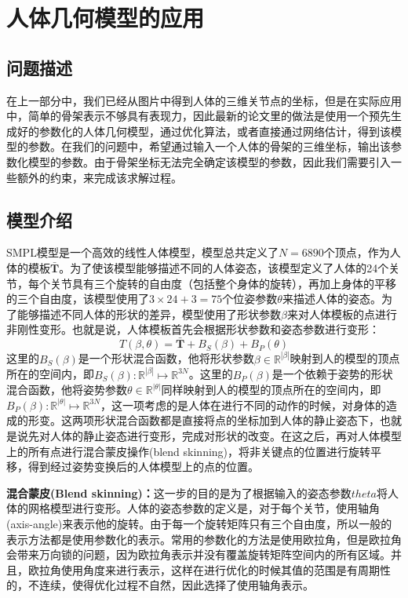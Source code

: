 \section{人体几何模型的应用}
\subsection{问题描述}
在上一部分中，我们已经从图片中得到人体的三维关节点的坐标，但是在实际应用中，简单的骨架表示不够具有表现力，因此最新的论文里的做法是使用一个预先生成好的参数化的人体几何模型，通过优化算法，或者直接通过网络估计，得到该模型的参数。在我们的问题中，希望通过输入一个人体的骨架的三维坐标，输出该参数化模型的参数。由于骨架坐标无法完全确定该模型的参数，因此我们需要引入一些额外的约束，来完成该求解过程。

\subsection{模型介绍}
SMPL模型是一个高效的线性人体模型，模型总共定义了\(N = 6890\)个顶点，作为人体的模板\(\bar{\bm{T}}\)。为了使该模型能够描述不同的人体姿态，该模型定义了人体的24个关节，每个关节具有三个旋转的自由度（包括整个身体的旋转），再加上身体的平移的三个自由度，该模型使用了\(3\times 24 + 3 = 75\)个位姿参数\(\theta\)来描述人体的姿态。为了能够描述不同人体的形状的差异，模型使用了形状参数\(\beta\)来对人体模板的点进行非刚性变形。也就是说，人体模板首先会根据形状参数和姿态参数进行变形：
\begin{equation}
    T(\beta, \theta) = \bar{\bm{T}} + B_S(\beta) + B_P(\theta)
\end{equation}
这里的\(B_S(\beta)\)是一个形状混合函数，他将形状参数\(\beta \in \mathbb{R}^{|\beta|}\)映射到人的模型的顶点所在的空间内，即\(B_S(\beta):\mathbb{R}^{|\beta|} \mapsto \mathbb{R}^{3N}\)。这里的\(B_P(\beta)\)是一个依赖于姿势的形状混合函数，他将姿势参数\(\theta \in \mathbb{R}^{|\theta|}\)同样映射到人的模型的顶点所在的空间内，即\(B_P(\beta):\mathbb{R}^{|\theta|} \mapsto \mathbb{R}^{3N}\)，这一项考虑的是人体在进行不同的动作的时候，对身体的造成的形变。这两项形状混合函数都是直接将点的坐标加到人体的静止姿态下，也就是说先对人体的静止姿态进行变形，完成对形状的改变。在这之后，再对人体模型上的所有点进行混合蒙皮操作(blend skinning)，将非关键点的位置进行旋转平移，得到经过姿势变换后的人体模型上的点的位置。

\textbf{混合蒙皮(Blend skinning)：}这一步的目的是为了根据输入的姿态参数\(theta\)将人体的网格模型进行变形。人体的姿态参数的定义是，对于每个关节，使用轴角(axis-angle)来表示他的旋转。由于每一个旋转矩阵只有三个自由度，所以一般的表示方法都是使用参数化的表示。常用的参数化的方法是使用欧拉角，但是欧拉角会带来万向锁的问题，因为欧拉角表示并没有覆盖旋转矩阵空间内的所有区域。并且，欧拉角使用角度来进行表示，这样在进行优化的时候其值的范围是有周期性的，不连续，使得优化过程不自然，因此选择了使用轴角表示。

